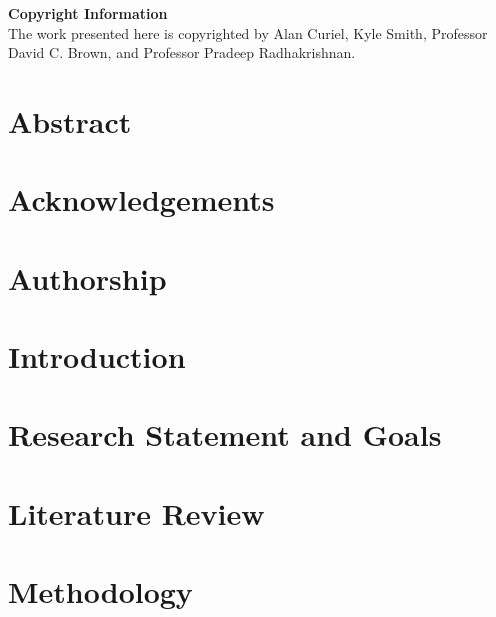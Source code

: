 \documentclass[12pt]{article}
\begin{document}

\thispagestyle{empty}
\newpage

\pagestyle{headings}

\vspace*{\fill}
\begin{center}
    \textbf{Copyright Information} \\
    The work presented here is copyrighted by Alan Curiel, Kyle Smith, Professor David C. Brown, and Professor Pradeep Radhakrishnan.
\end{center}
\vspace*{\fill}
\newpage

\section*{Abstract}

\newpage

\section*{Acknowledgements}

\newpage

\section*{Authorship}

\newpage

\tableofcontents
\newpage

\listoffigures
\newpage

\listoftables
\newpage

\section{Introduction}
\label{sec:intro}

\newpage

\section{Research Statement and Goals}
\label{sec:req}

\newpage

\section{Literature Review}
\label{sec:lit}

\newpage

\section{Methodology}
\label{sec:method}

\newpage
\end{document}
